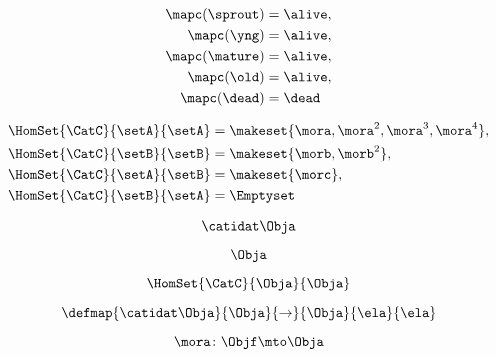\begin{forslides}
    \begin{equation}
        \label{eq:semicats-slides-84}
        \begin{aligned}
            \mapc(\sprout) & = \alive, \\
            \mapc(\yng)    & =  \alive, \\
            \mapc(\mature) & = \alive , \\
            \mapc( \old)   & = \alive, \\
            \mapc (\dead)  & = \dead
        \end{aligned}
    \end{equation}

    \begin{equation}
        \label{eq:semicats-slides-85}
        \begin{aligned}
            \HomSet{\CatC}{\setA}{\setA} & = \makeset{ \mora, \mora^2, \mora^3, \mora^4 }, \\
            \HomSet{\CatC}{\setB}{\setB} & =  \makeset{ \morb, \morb^2 }, \\
            \HomSet{\CatC}{\setA}{\setB} & =  \makeset{ \morc }, \\
            \HomSet{\CatC}{\setB}{\setA} & = \Emptyset
        \end{aligned}
    \end{equation}

    \begin{equation}
        \label{eq:semicats-slides-86}
        \catidat\Obja
    \end{equation}

    \begin{equation}
        \label{eq:semicats-slides-87}
        \Obja
    \end{equation}

    \begin{equation}
        \label{eq:semicats-slides-88}
        \HomSet{\CatC}{\Obja}{\Obja}
    \end{equation}

    \begin{equation}
        \label{eq:semicats-slides-89}
        \defmap{
            \catidat\Obja
        }{
            \Obja
        }{
            \to
        }{
            \Obja
        }{
            \ela
        }{
            \ela
        }
    \end{equation}

    \begin{equation}
        \label{eq:semicats-slides-90}
        \mora \colon \Objf \mto \Obja
    \end{equation}


\end{forslides}
